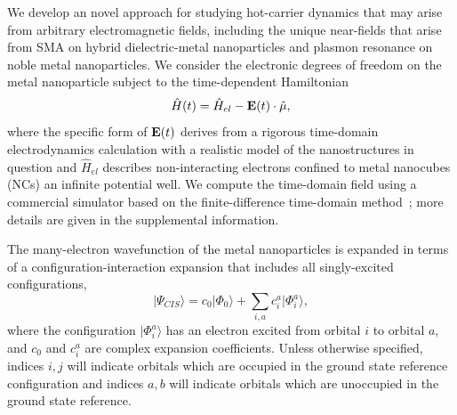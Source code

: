 \documentclass[journal=jpclcd,manuscript=letter]{achemso}
\begin{document}
We develop an novel approach for studying hot-carrier dynamics that may arise from arbitrary electromagnetic
fields, including the unique near-fields that arise from SMA on hybrid dielectric-metal nanoparticles and plasmon resonance
on noble metal nanoparticles.
We consider the electronic degrees of freedom on the metal nanoparticle subject to the time-dependent Hamiltonian 
\begin{equation}\label{eq:TDHam}
\hat{H}(t) = \hat{H}_{el} - {\bf E}(t) \cdot \hat{\mu}, 
\end{equation}
where the specific form of ${\bf E}(t)$ derives from a rigorous time-domain electrodynamics calculation with a realistic model
of the nanostructures in question and $\hat{H}_{el}$ describes non-interacting electrons confined to metal nanocubes (NCs) an infinite potential well.  
We compute the time-domain field 
using a commercial simulator based on the finite-difference time-domain method~\cite{Lumerical}; more details are given in 
the supplemental information.    

The many-electron wavefunction of the metal nanoparticles is expanded in terms of a configuration-interaction expansion that
includes all singly-excited configurations,
\begin{equation}\label{eq:CIS}
|\Psi_{CIS}\rangle = c_0 |\Phi_0 \rangle + \sum_{i,a} c_i^a |\Phi_i^a\rangle,
\end{equation}
where the configuration $|\Phi_i^a\rangle$ has an electron excited from orbital $i$ to orbital $a$, 
and $c_0$ and $c_i^a$ are complex expansion coefficients.  Unless otherwise specified, indices $i, j$ will indicate
orbitals which are occupied in the ground state reference configuration and indices $a, b$ will indicate orbitals
which are unoccupied in the ground state reference.  
\end{document}
